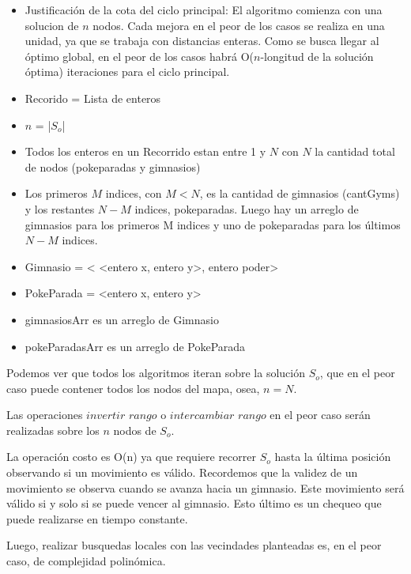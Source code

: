 \begin{algorithm}[H]


\end{algorithm}

\begin{itemize}
\item Justificación de la cota del ciclo principal: El algoritmo comienza con una solucion de $n$ nodos. Cada mejora en el peor de los casos se realiza en una unidad, ya que se trabaja con distancias enteras. Como se busca llegar al óptimo global, en el peor de los casos habrá O($n$-longitud de la solución óptima) iteraciones para el ciclo principal.
\item Recorido = Lista de enteros
\item $n$ = |$S_o$|
\item Todos los enteros en un Recorrido estan entre 1 y $N$ con $N$ la cantidad total de nodos (pokeparadas y gimnasios)
\item Los primeros $M$ indices, con $M < N$, es la cantidad de gimnasios (cantGyms) y los restantes $N-M$ indices,  pokeparadas. Luego hay un arreglo de gimnasios para los primeros M indices y uno de pokeparadas para los últimos $N-M$ indices.
\item Gimnasio = < <entero x, entero y>, entero poder>
\item PokeParada = <entero x, entero y>
\item gimnasiosArr es un arreglo de Gimnasio
\item pokeParadasArr es un arreglo de PokeParada
\end{itemize}

Podemos ver que todos los algoritmos iteran sobre la solución $S_o$, que en el peor caso puede contener todos los nodos del mapa, osea, $n=N$.

Las operaciones $invertir$ $rango$ o $intercambiar$ $rango$ en el peor caso serán realizadas sobre los $n$ nodos de $S_o$.

La operación costo es O(n) ya que requiere recorrer $S_o$ hasta la última posición observando si un movimiento es válido. Recordemos que la validez de un movimiento se observa cuando se avanza hacia un gimnasio. Este movimiento será válido si y solo si se puede vencer al gimnasio. Esto último es un chequeo que puede realizarse en tiempo constante.  

Luego, realizar busquedas locales con las vecindades planteadas es, en el peor caso, de complejidad polinómica. 



